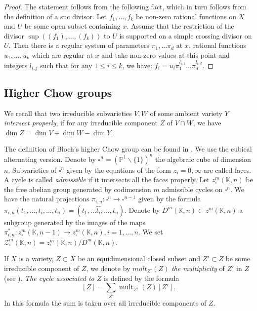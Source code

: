 \documentclass[12pt]{extarticle}
\def\mb{\mathbb}
\def\mc{\mathcal}
\def\k{\mb K}
\renewcommand{\P}{{\mb P}}
\def\bs{\backslash}
\DeclareMathOperator{\mult}{mult}
\begin{document}
\begin{proof}
The statement follows from the following fact, which in turn follows from the definition of a snc divisor. Let $f_1, \dots, f_k$ be non-zero rational functions on $X$ and $U$ be some open subset containing $x$. Assume that the restriction of the divisor $\sup((f_1),\dots, (f_k))$ to $U$ is supported on a simple crossing divisor on $U$.  Then  there is a regular system of parameters $\pi_1,\dots \pi_d$ at $x$, rational functions $u_1,\dots, u_k$ which are regular at $x$ and take non-zero values at this point and integers $l_{i,j}$ such that for any $1\leq i\leq k$, we have: $f_i=u_i\pi_1^{l_{i,1}}\dots \pi_d^{l_{i,d}}$. 
\end{proof}


\subsection{Higher Chow groups}
\label{subsec:higher_chow_groups}
We recall that two irreducible subvarieties $V,W$ of some ambient variety $Y$  \emph{intersect properly}, if for any irreducible component $Z$ of $V\cap W$, we have $\dim Z=\dim V+\dim W-\dim Y$.

The definition of Bloch's higher Chow group can be found in \cite{bloch_rriz_1994_mixed}. We use the cubical alternating version.  Denote by $\square^n=(\P^1\bs\{1\})^n$ the algebraic cube of dimension $n$. Subvarieties of $\square^n$ given by the equations of the form $z_i=0,\infty$ are called faces. A cycle is called \emph{admissible} if it intersects all the faces properly. Let $z^m_\square(\k,n)$ be the free abelian group generated by codimension $m$ admissible cycles on $\square^n$. We have the natural projections $\pi_{i,n}\colon \square^n\to\square^{n-1}$ given by the formula $\pi_{i,n}(t_1,\dots, t_i,\dots, t_n)=(t_1,\dots\hat{t_i}, \dots, t_n)$. Denote by $D^m(\k, n)\subset z^m(\k,n)$ a subgroup generated by the images of the maps  $\pi_{i,n}^*\colon z_\square^{m}(\k, n-1)\to z^m_\square(\k, n), i=1,\dots, n$. We set $\mc Z^m_\square(\k,n)= z^m_\square(\k,n)/D^m(\k,n)$.

If $X$ is a variety, $Z\subset X$ be an equidimensional closed subset and $Z'\subset Z$ be some irreducible component of $Z$, we denote by $mult_{Z'}(Z)$ \emph{the  multiplicity} of $Z'$ in $Z$(see \cite[1.5]{fulton2013intersection}). \emph{The cycle associated to $Z$} is defined by the formula
$$[Z]=\sum\limits_{Z'}\mult_{Z'}(Z)[Z'].$$
In this formula the sum is taken over all irreducible components of $Z$.
\end{document}
